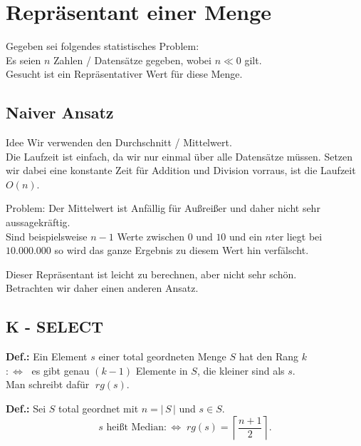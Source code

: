 \chapter{Repräsentant einer Menge}

Gegeben sei folgendes statistisches Problem:\\
Es seien $n$ Zahlen / Datensätze gegeben, wobei $n \ll 0$ gilt.\\
Gesucht ist ein Repräsentativer Wert für diese Menge.

\section{Naiver Ansatz}

\begin{description}

\item{Idee} Wir verwenden den Durchschnitt / Mittelwert.\\
Die Laufzeit ist einfach, da wir nur einmal über alle Datensätze müssen. Setzen wir dabei eine konstante Zeit für Addition und Division vorraus, ist die Laufzeit $O(n)$.

\item{Problem:} Der Mittelwert ist Anfällig für Außreißer und daher nicht sehr aussagekräftig.\\
Sind beispielsweise $n-1$ Werte zwischen $0$ und $10$ und ein $n$ter liegt bei $10.000.000$ so wird das ganze Ergebnis zu diesem Wert hin verfälscht.

\end{description}

Dieser Repräsentant ist leicht zu berechnen, aber nicht sehr schön.\\
Betrachten wir daher einen anderen Ansatz.

\section{K - SELECT}

\begin{description}

\item{\bfseries Def.:} Ein Element $s$ einer total geordneten Menge $S$ hat den Rang $k$ \\$:\Leftrightarrow \;$ es gibt genau $(k-1)$ Elemente in $S$, die kleiner sind als $s$.\\

Man schreibt dafür $\; rg(s)$.

\item{\bfseries Def.:} Sei $S$ total geordnet mit $n = |\,S\,|$ und $s\in S$.\\
$$s \text{ heißt Median} :\Leftrightarrow \; rg(s) = \left\lceil \frac{n+1}{2} \right\rceil .$$

\end{description}

